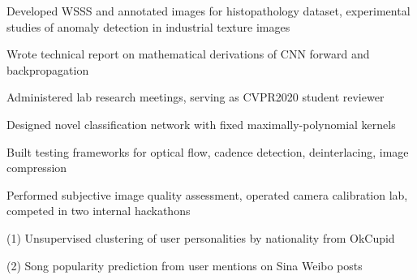 \documentclass[11pt]{cv_style}
\begin{document}
\begin{ditem}
	\item Developed WSSS and annotated images for histopathology dataset, experimental studies of anomaly detection in industrial texture images
	\item Wrote technical report on mathematical derivations of CNN forward and backpropagation
	\item Administered lab research meetings, serving as CVPR2020 student reviewer
\end{ditem}

%
\begin{ditem}
	\item Designed novel classification network with fixed maximally-polynomial kernels
\end{ditem}
%
\begin{ditem}
	\item Built testing frameworks for optical flow, cadence detection, deinterlacing, image compression
	\item Performed subjective image quality assessment, operated camera calibration lab, competed in two internal hackathons
\end{ditem}
%
\begin{ditem}
	\item (1) Unsupervised clustering of user personalities by nationality from OkCupid
	\item (2) Song popularity prediction from user mentions on Sina Weibo posts
\end{ditem}
%
\end{document}
